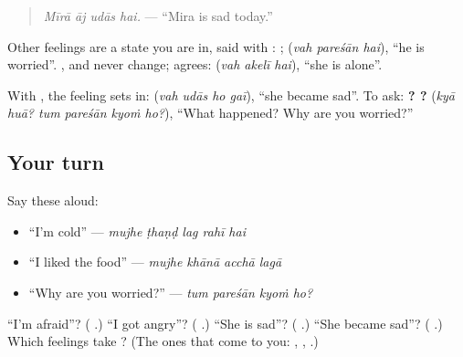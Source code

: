 \begin{quote}
\emph{Mīrā āj udās hai.} — \textquotedblleft{}Mira is sad today.\textquotedblright{}
\end{quote}

Other feelings are a state you are in, said with \textbf{}: \textbf{  }; \textbf{  } (\emph{vah pareśān hai}), \textquotedblleft{}he is worried\textquotedblright{}. \textbf{}, \textbf{} and \textbf{} never change; \textbf{} agrees: \textbf{  } (\emph{vah akelī hai}), \textquotedblleft{}she is alone\textquotedblright{}.

With \textbf{ }, the feeling sets in: \textbf{   } (\emph{vah udās ho gaī}), \textquotedblleft{}she became sad\textquotedblright{}. To ask: \textbf{ ?    ?} (\emph{kyā huā? tum pareśān kyoṁ ho?}), \textquotedblleft{}What happened? Why are you worried?\textquotedblright{}

\subsection*{Your turn}
Say these aloud:

\begin{itemize}
\raggedright
  \item \textquotedblleft{}I'm cold\textquotedblright{} — \emph{mujhe ṭhaṇḍ lag rahī hai}
  \item \textquotedblleft{}I liked the food\textquotedblright{} — \emph{mujhe khānā acchā lagā}
  \item \textquotedblleft{}Why are you worried?\textquotedblright{} — \emph{tum pareśān kyoṁ ho?}
\end{itemize}

\begin{tcolorbox}[breakable,colback=teal!4,colframe=teal!35!black,title={Before you move on}]
\textquotedblleft{}I'm afraid\textquotedblright{}? (\textbf{   }.) \textquotedblleft{}I got angry\textquotedblright{}? (\textbf{  }.) \textquotedblleft{}She is sad\textquotedblright{}? (\textbf{  }.) \textquotedblleft{}She became sad\textquotedblright{}? (\textbf{   }.) Which feelings take \textbf{}? (The ones that come to you: \textbf{}, \textbf{}, \textbf{}.)
\end{tcolorbox}
